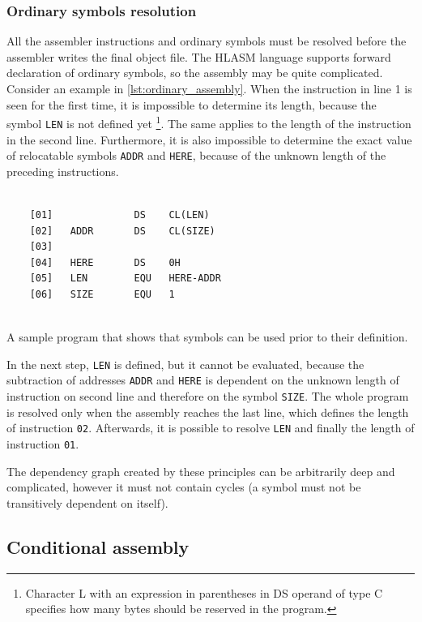 \subsubsection{Ordinary symbols resolution}
\label{ordinary_resolution}
All the assembler instructions and ordinary symbols must be resolved before the assembler writes the final object file. The HLASM language supports forward declaration of ordinary symbols, so the assembly may be quite complicated. Consider an example in \cref{lst:ordinary_assembly}. When the instruction in line 1 is seen for the first time, it is impossible to determine its length, because the symbol \verb|LEN| is not defined yet \footnote{Character L with an expression in parentheses in DS operand of type C specifies how many bytes should be reserved in the program.}. The same applies to the length of the instruction in the second line. Furthermore, it is also impossible to determine the exact value of relocatable symbols \verb|ADDR| and \verb|HERE|, because of the unknown length of the preceding instructions.

\begin{listing}[t]
	\begin{verbatim}
	
	[01]              DS    CL(LEN)
	[02]   ADDR       DS    CL(SIZE)
	[03]
	[04]   HERE       DS    0H
	[05]   LEN        EQU   HERE-ADDR
	[06]   SIZE       EQU   1
	
	\end{verbatim}
	\caption{A sample program that shows that symbols can be used prior to their definition.}
	\label{lst:ordinary_assembly}
\end{listing}


In the next step, \verb|LEN| is defined, but it cannot be evaluated, because the subtraction of addresses \verb|ADDR| and \verb|HERE| is dependent on the unknown length of instruction on second line and therefore on the symbol \verb|SIZE|. The whole program is resolved only when the assembly reaches the last line, which defines the length of instruction \verb|02|. Afterwards, it is possible to resolve \verb|LEN| and finally the length of instruction \verb|01|.

The dependency graph created by these principles can be arbitrarily deep and complicated, however it must not contain cycles (a symbol must not be transitively dependent on itself).

\subsection{Conditional assembly}
\label{CA_proc}

